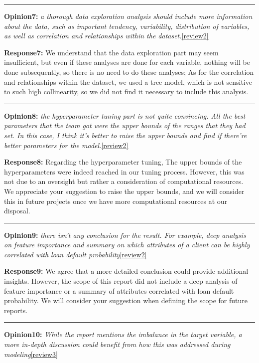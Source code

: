 \documentclass{article}
\begin{document}
\noindent\rule[0.5ex]{16cm}{1pt}

 \textbf{Opinion7:} 
\textit{a thorough data exploration analysis should include more information about the data, such as important tendency, variability, distribution of variables, as well as correlation and relationships within the dataset.}\ref{review2}

\textbf{Response7:}
We understand that the data exploration part may seem insufficient, but even if these analyses are done for each variable, nothing will be done subsequently, so there is no need to do these analyses; As for the correlation and relationships within the dataset, we used a tree model, which is not sensitive to such high collinearity\cite{TOMASCHEK2018249}, so we did not find it necessary to include this analysis.

\noindent\rule[0.5ex]{16cm}{1pt}

\textbf{Opinion8:} 
\textit{the hyperparameter tuning part is not quite convincing. All the best parameters that the
team got were the upper bounds of the ranges that they had set. In this case, I think
it’s better to raise the upper bounds and find if there’re better parameters for the
model.}\ref{review2}

\textbf{Response8:}
Regarding the hyperparameter tuning, The upper bounds of the hyperparameters were indeed reached in our tuning process. However, this was not due to an oversight but rather a consideration of computational resources. We appreciate your suggestion to raise the upper bounds, and we will consider this in future projects once we have more computational resources at our disposal.

\noindent\rule[0.5ex]{16cm}{1pt}

\textbf{Opinion9:} 
\textit{there isn’t any conclusion for the result. For example, deep analysis on feature importance and summary on which attributes of a client can be highly correlated with loan default probability}\ref{review2}

\textbf{Response9:}
We agree that a more detailed conclusion could provide additional insights. However, the scope of this report did not include a deep analysis of feature importance or a summary of attributes correlated with loan default probability. We will consider your suggestion when defining the scope for future reports.

\noindent\rule[0.5ex]{16cm}{1pt}

\textbf{Opinion10:} 
\textit{While the report mentions the imbalance in the target variable, a more in-depth discussion could benefit from how this was addressed during modeling}\ref{review3}
\end{document}
